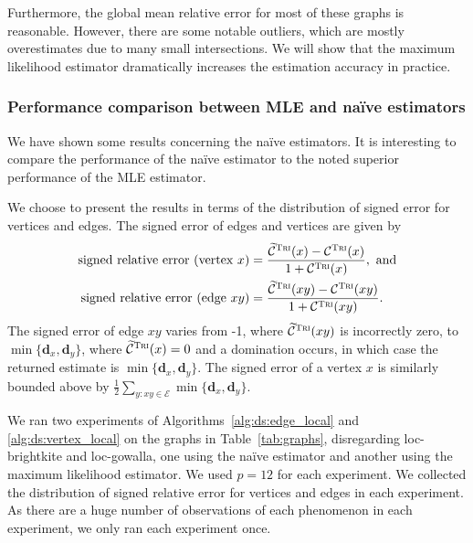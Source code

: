 \documentclass[10]{report}
\newcommand{\algoname}[1]{\textnormal{\textsc{#1}}}
\begin{document}
Furthermore, the global mean relative error for most of these graphs is reasonable. 
However, there are some notable outliers, which are mostly overestimates due to many small intersections. 
We will show that the maximum likelihood estimator dramatically increases the estimation accuracy in practice.

\subsubsection{Performance comparison between MLE and na\"ive estimators}

We have shown some results concerning the na\"ive estimators. 
It is interesting to compare the performance of the na\"ive estimator to the noted superior performance of the MLE estimator.

We choose to present the results in terms of the distribution of signed error for vertices and edges. 
The signed error of edges and vertices are given by
%
\begin{align}
\label{eq:vertex_sre}
\text{signed relative error (vertex $x$)} &= \frac{\widetilde{\mathcal{C}}^{\algoname{Tri}}(x) - \mathcal{C}^{\algoname{Tri}}(x)}{1 + \mathcal{C}^{\algoname{Tri}}(x)}, \text{ and} \\
\label{eq:edge_sre}
\text{signed relative error (edge $xy$)} &= \frac{\widetilde{\mathcal{C}}^{\algoname{Tri}}(xy) - \mathcal{C}^{\algoname{Tri}}(xy)}{1 + \mathcal{C}^{\algoname{Tri}}(xy)}.
\end{align}
%
The signed error of edge $xy$ varies from -1, where $\widetilde{\mathcal{C}}^{\algoname{Tri}}(xy)$ is incorrectly zero, to $\min \{ \mathbf{d}_x, \mathbf{d}_y \}$, where $\widetilde{\mathcal{C}}^{\algoname{Tri}}(x) = 0$ and a domination occurs, in which case the returned estimate is $\min \{ \mathbf{d}_x, \mathbf{d}_y \}$.
The signed error of a vertex $x$ is similarly bounded above by $\frac{1}{2} \sum_{y : xy \in \mathcal{E}} \min \{\mathbf{d}_x, \mathbf{d}_y \}$.

We ran two experiments of Algorithms~\ref{alg:ds:edge_local} and \ref{alg:ds:vertex_local} on the graphs in Table~\ref{tab:graphs}, disregarding loc-brightkite and loc-gowalla, one using the na\"ive estimator and another using the maximum likelihood estimator.
We used $p=12$ for each experiment. 
We collected the distribution of signed relative error for vertices and edges in each experiment.
As there are a huge number of observations of each phenomenon in each experiment, we only ran each experiment once.
\end{document}
